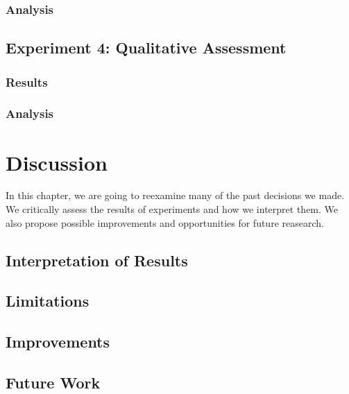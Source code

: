 \documentclass[runningheads]{llncs}
\begin{document}
\subsubsection{Analysis}


\subsection{Experiment 4: Qualitative Assessment}
\label{sec:experiment4}
\subsubsection{Results}

\subsubsection{Analysis}



\section{Discussion}
\label{ch:discussion}
In this chapter, we are going to reexamine many of the past decisions we made. We critically assess the results of experiments and how we interpret them. We also propose possible improvements and opportunities for future reasearch.

\subsection{Interpretation of Results}


\subsection{Limitations}


\subsection{Improvements}



\subsection{Future Work}

\end{document}
